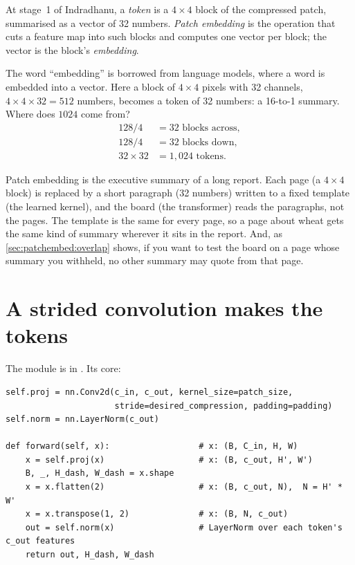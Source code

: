 \begin{definition}
At stage~1 of Indradhanu, a \emph{token} is a $4\times4$ block of the compressed patch,
summarised as a vector of 32 numbers. \emph{Patch embedding} is the operation
that cuts a feature map into such blocks and computes one vector per block; the vector is the block's
\emph{embedding}.
\end{definition}

The word ``embedding'' is borrowed from language models, where a word is embedded into a vector. Here a
block of $4\times4$ pixels with 32 channels, $4\times4\times32 = 512$ numbers, becomes a token of 32
numbers: a 16-to-1 summary. Where does $1024$ come from?
\begin{align*}
128 / 4 &= 32 \text{ blocks across},\\
128 / 4 &= 32 \text{ blocks down},\\
32\times32 &= 1{,}024 \text{ tokens}.
\end{align*}

\begin{analogy}
Patch embedding is the executive summary of a long report. Each page (a $4\times4$ block) is replaced by
a short paragraph (32 numbers) written to a fixed template (the learned kernel), and the board (the
transformer) reads the paragraphs, not the pages. The template is the same for every page, so a page
about wheat gets the same kind of summary wherever it sits in the report. And, as \cref{sec:patchembed:overlap}
shows, if you want to test the board on a page whose summary you withheld, no other summary may quote
from that page.
\end{analogy}

\section{A strided convolution makes the tokens}\label{sec:patchembed:conv}

The module is  in
. Its core:
\begin{lstlisting}
self.proj = nn.Conv2d(c_in, c_out, kernel_size=patch_size,
                      stride=desired_compression, padding=padding)
self.norm = nn.LayerNorm(c_out)

def forward(self, x):                  # x: (B, C_in, H, W)
    x = self.proj(x)                   # x: (B, c_out, H', W')
    B, _, H_dash, W_dash = x.shape
    x = x.flatten(2)                   # x: (B, c_out, N),  N = H' * W'
    x = x.transpose(1, 2)              # x: (B, N, c_out)
    out = self.norm(x)                 # LayerNorm over each token's c_out features
    return out, H_dash, W_dash
\end{lstlisting}

